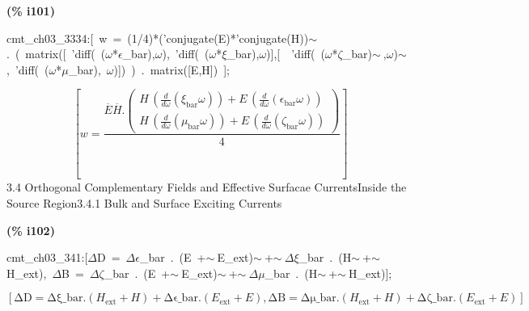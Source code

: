 \documentclass[fleqn]{article}
\begin{document}
\noindent
\begin{minipage}[t]{4.000000em}\color{red}\bfseries
(\% i101)	
\end{minipage}
\begin{minipage}[t]{\textwidth}\color{blue}
cmt\_ch03\_3334:[\ w\ =\ (1/4)*('conjugate(E)*'conjugate(H))\ensuremath{\sim\ }.\ (\ matrix([\ 'diff(\ (\ensuremath{\omega}*\ensuremath{\epsilon}\_bar),\ensuremath{\omega}),\ 'diff(\ (\ensuremath{\omega}*\ensuremath{\xi}\_bar),\ensuremath{\omega})],[\ \ 'diff(\ (\ensuremath{\omega}*\ensuremath{\zeta}\_bar)\ensuremath{\sim\ },\ensuremath{\omega})\ensuremath{\sim\ },\ 'diff(\ (\ensuremath{\omega}*\ensuremath{\mu}\_bar),\ \ensuremath{\omega})])\ )\ .\ matrix([E,H])\ ];
\end{minipage}
\[\displaystyle \tag{cmt\_ ch03\_ 3334} 
\left[ w=\frac{\overline{E} \overline{H}\ensuremath{\mathrm{ . }}\begin{pmatrix}H\, \left( \frac{d}{d \omega } \left( {{\xi }_{\ensuremath{\mathrm{bar}}}} \omega \right) \right) +E\, \left( \frac{d}{d \omega } \left( {{\epsilon }_{\ensuremath{\mathrm{bar}}}} \omega \right) \right) \\
H\, \left( \frac{d}{d \omega } \left( {{\mu }_{\ensuremath{\mathrm{bar}}}} \omega \right) \right) +E\, \left( \frac{d}{d \omega } \left( {{\zeta }_{\ensuremath{\mathrm{bar}}}} \omega \right) \right) \end{pmatrix}}{4}\right] \mbox{}
\]
3.4     Orthogonal Complementary Fields and Effective Surfacae CurrentsInside the Source Region3.4.1 Bulk and Surface Exciting Currents


\noindent
\begin{minipage}[t]{4.000000em}\color{red}\bfseries
(\% i102)	
\end{minipage}
\begin{minipage}[t]{\textwidth}\color{blue}
cmt\_ch03\_341:[\ensuremath{\Delta}D\ =\ \ensuremath{\Delta}\ensuremath{\epsilon}\_bar\ .\ (E\ +\ensuremath{\sim\ }E\_ext)\ensuremath{\sim\ }+\ensuremath{\sim\ }\ensuremath{\Delta}\ensuremath{\xi}\_bar\ .\ (H\ensuremath{\sim\ }+\ensuremath{\sim\ }H\_ext),\ \ensuremath{\Delta}B\ =\ \ensuremath{\Delta}\ensuremath{\zeta}\_bar\ .\ (E\ +\ensuremath{\sim\ }E\_ext)\ensuremath{\sim\ }+\ensuremath{\sim\ }\ensuremath{\Delta}\ensuremath{\mu}\_bar\ .\ (H\ensuremath{\sim\ }+\ensuremath{\sim\ }H\_ext)];
\end{minipage}
\[\displaystyle \tag{cmt\_ ch03\_ 341} 
\left[ \ensuremath{\mathrm{\Delta D}}=\ensuremath{\mathrm{\Delta \xi \_ bar}}\ensuremath{\mathrm{ . }}\left( {H_{\ensuremath{\mathrm{ext}}}}+H\right) +\ensuremath{\mathrm{\Delta \epsilon \_ bar}}\ensuremath{\mathrm{ . }}\left( {E_{\ensuremath{\mathrm{ext}}}}+E\right) \operatorname{,}\ensuremath{\mathrm{\Delta B}}=\ensuremath{\mathrm{\Delta \mu \_ bar}}\ensuremath{\mathrm{ . }}\left( {H_{\ensuremath{\mathrm{ext}}}}+H\right) +\ensuremath{\mathrm{\Delta \zeta \_ bar}}\ensuremath{\mathrm{ . }}\left( {E_{\ensuremath{\mathrm{ext}}}}+E\right) \right] \mbox{}
\]
\end{document}

